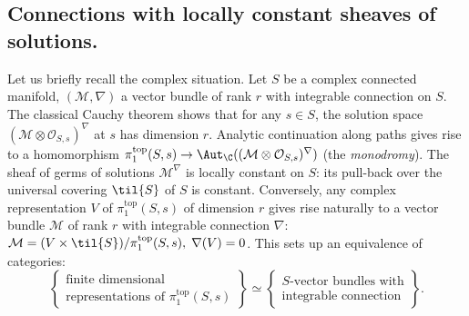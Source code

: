 \subsection{Connections with locally constant sheaves of solutions.}
\label{sub-connection}
\begin{para}
 Let us briefly recall the complex situation. Let $S$ be a complex
 connected manifold, $(\mathcal{M},\nabla)$ a vector bundle of rank $r$
 with integrable connection on $S$. The classical Cauchy theorem shows
 that for any $s \in S$, the solution space
 $(\mathcal{M}\otimes\mathcal{O}_{S,s})^{\nabla}$ at $s$ has dimension
 $r$. Analytic continuation along paths gives rise to a homomorphism
 $\pi_1^{\mathrm{top}}(S,{s}) \rightarrow
 \Aut_{\C}((\mathcal{M}\otimes\mathcal{O}_{S,s})^{\nabla})$ (the
 \emph{monodromy}). The sheaf of germs of solutions
 $\mathcal{M}^{\nabla}$ is locally constant on $S$: its pull-back over
 the universal covering $\til{S}$ of $S$ is constant. Conversely, any
 complex representation $V$ of $\pi_1^{\mathrm{top}}(S,{s})$ of dimension $r$
 gives rise naturally to a vector bundle $\mathcal{M}$ of rank $r$ with
 integrable connection $\nabla$:  $\mathcal{M}= (V \times
 \til{S})/\pi_1^{\mathrm{top}}(S,{s}), \; \nabla(V) = 0$.  This sets up an
 equivalence of categories:
 \begin{equation*}
  \left\{
  \begin{matrix}
   \text{finite dimensional}\\
   \text{representations of $\pi_1^{\mathrm{top}}(S,{s})$}
  \end{matrix}
  \right\}
  \simeq
  \left\{
  \begin{matrix}
   \text{$S$-vector bundles with}\\
   \text{integrable connection}
  \end{matrix}
  \right\}.
 \end{equation*}
\end{para}  
